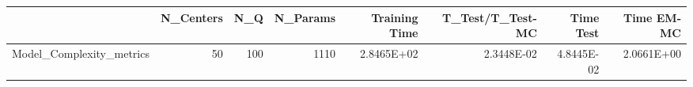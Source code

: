 \begin{tabular}{lrrrrrrr}
\toprule
{} &  N\_Centers &  N\_Q &  N\_Params &  Training Time &  T\_Test/T\_Test-MC &  Time Test &  Time EM-MC \\
\midrule
Model\_Complexity\_metrics &         50 &  100 &      1110 &     2.8465E+02 &        2.3448E-02 & 4.8445E-02 &  2.0661E+00 \\
\bottomrule
\end{tabular}

